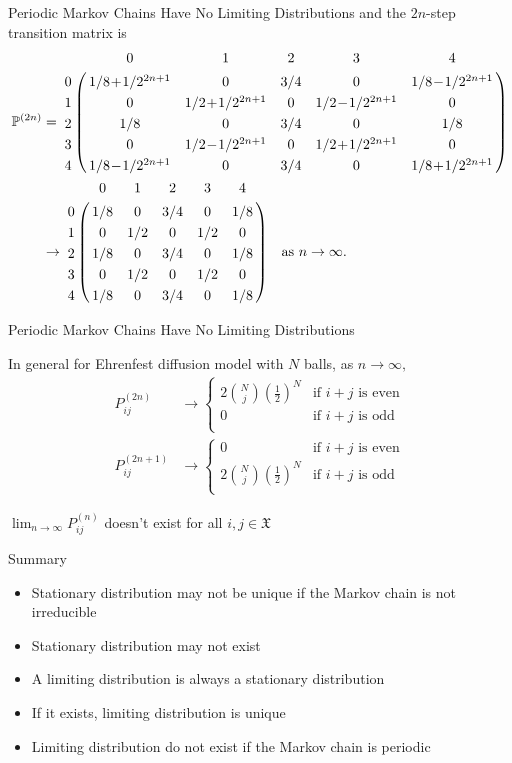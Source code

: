 \documentclass[letterpaper,handout]{beamer}
\def\P{\mathbb{P}}
\def\X{\mathfrak{X}}
\begin{document}
\begin{frame}{Periodic Markov Chains Have No Limiting Distributions}
and the $2n$-step transition matrix is
\footnotesize
\begin{align*}
\P^{(2n)}&=
\bordermatrix{%
  &  0  &  1  &  2  &  3  &  4 \cr
0 & 1/8\!+\!1/2^{2n+1} &  0  & 3/4 &  0  & 1/8\!-\!1/2^{2n+1}\cr
1 &  0  & 1/2\!+\!1/2^{2n+1} &  0  & 1/2\!-\!1/2^{2n+1} &  0 \cr
2 & 1/8             &  0  & 3/4 &  0  & 1/8\cr
3 &  0  & 1/2\!-\!1/2^{2n+1} &  0  & 1/2\!+\!1/2^{2n+1} &  0 \cr
4 & 1/8\!-\!1/2^{2n+1} &  0  & 3/4 &  0  & 1/8\!+\!1/2^{2n+1}
}\\
&\to
\bordermatrix{%
  &  0  &  1  &  2  &  3  &  4 \cr
0 & 1/8 &  0  & 3/4 &  0  & 1/8\cr
1 &  0  & 1/2 &  0  & 1/2 &  0 \cr
2 & 1/8 &  0  & 3/4 &  0  & 1/8\cr
3 &  0  & 1/2 &  0  & 1/2 &  0 \cr
4 & 1/8 &  0  & 3/4 &  0  & 1/8
}\quad\text{as }n\to\infty.
\end{align*}
\end{frame}
\begin{frame}{Periodic Markov Chains Have No Limiting Distributions}

In general for Ehrenfest diffusion model with $N$ balls, as $n\to\infty,$
\begin{align*}
P^{(2n)}_{ij}
&\to\begin{cases}
2{N\choose j}(\frac{1}{2})^{N}&\text{if $i+j$ is even}\\
 0            &\text{if $i+j$ is odd}\\
 \end{cases}\\
P^{(2n+1)}_{ij}
&\to\begin{cases}
 0            &\text{if $i+j$ is even}\\
2{N\choose j}(\frac{1}{2})^{N}&\text{if $i+j$ is odd}\\
 \end{cases}
\end{align*}
\bigskip

$\lim_{n\to\infty}P^{(n)}_{ij}$ doesn't exist for all $i,j\in\X$
\end{frame}
\begin{frame}{Summary}
\begin{itemize}
\item Stationary distribution may not be unique if the Markov chain is not irreducible
\item Stationary distribution may not exist
\item A limiting distribution is always a stationary distribution
\item If it exists, limiting distribution is unique
\item Limiting distribution do not exist if the Markov chain is periodic
\end{itemize}
\end{frame}
\end{document}
